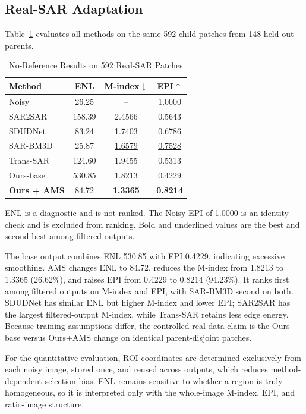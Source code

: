 \documentclass[conference]{IEEEtran}
\begin{document}
\subsection{Real-SAR Adaptation}
Table~\ref{tab:real} evaluates all methods on the same 592 child patches from 148 held-out parents.
\begin{table}[!t]
\caption{No-Reference Results on 592 Real-SAR Patches}
\label{tab:real}
\centering
\footnotesize
\setlength{\tabcolsep}{3.0pt}
\renewcommand{\arraystretch}{1.06}
\begin{tabular}{@{\extracolsep{\fill}}lccc@{}}
\toprule
\textbf{Method} & \textbf{ENL} & \(\mathbf{M}\)\textbf{-index}$\downarrow$ & \textbf{EPI}$\uparrow$ \\
\midrule
Noisy       & 26.25  & --                 & 1.0000 \\
SAR2SAR     & 158.39 & 2.4566             & 0.5643 \\
SDUDNet     & 83.24  & 1.7403             & 0.6786 \\
SAR-BM3D    & 25.87  & \underline{1.6579} & \underline{0.7528} \\
Trans-SAR   & 124.60 & 1.9455             & 0.5313 \\
Ours-base   & 530.85 & 1.8213             & 0.4229 \\
\textbf{Ours + AMS} & 84.72 & \textbf{1.3365} & \textbf{0.8214} \\
\bottomrule
\end{tabular}
\vspace{1pt}
\parbox{0.98\columnwidth}{\scriptsize ENL is a diagnostic and is not ranked. The Noisy EPI of 1.0000 is an identity check and is excluded from ranking. Bold and underlined values are the best and second best among filtered outputs.}
\end{table}
The base output combines ENL 530.85 with EPI 0.4229, indicating excessive smoothing. AMS changes ENL to 84.72, reduces the M-index from 1.8213 to 1.3365 (26.62\%), and raises EPI from 0.4229 to 0.8214 (94.23\%). It ranks first among filtered outputs on M-index and EPI, with SAR-BM3D second on both. SDUDNet has similar ENL but higher M-index and lower EPI; SAR2SAR has the largest filtered-output M-index, while Trans-SAR retains less edge energy. Because training assumptions differ, the controlled real-data claim is the Ours-base versus Ours+AMS change on identical parent-disjoint patches.

For the quantitative evaluation, ROI coordinates are determined exclusively from each noisy image, stored once, and reused across outputs, which reduces method-dependent selection bias. ENL remains sensitive to whether a region is truly homogeneous, so it is interpreted only with the whole-image M-index, EPI, and ratio-image structure.
\end{document}
